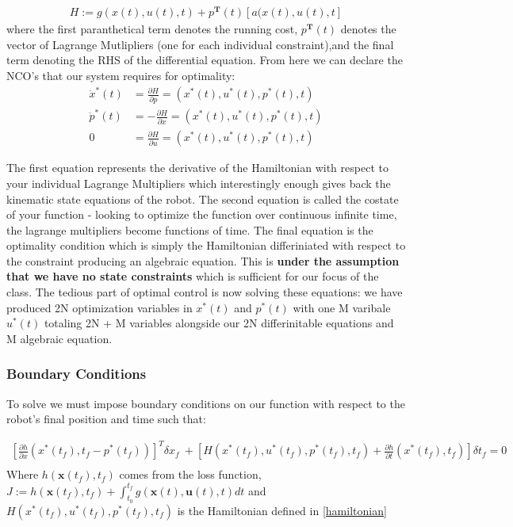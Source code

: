 ﻿\documentclass[twoside]{article}
\begin{document}
\begin{equation} \label{hamiltonian}
\begin{split}
H := g(x(t), u(t), t) + p^\textbf{T}(t)[a(x(t), u(t), t]
\end{split}
\end{equation}
where the first paranthetical term denotes the running cost, $p^\textbf{T}(t)$ denotes the vector of Lagrange Mutlipliers (one for each individual constraint),and the final term denoting the RHS of the differential equation.
From here we can declare the NCO's that our system requires for optimality:
\begin{equation} \label{hamiltonianNCOs}
\begin{split}
\dot{x}^*(t) &= \frac{\partial{H}}{\partial{p}} = (x^*(t), u^*(t), p^*(t), t)\\
\dot{p}^*(t) &= -\frac{\partial{H}}{\partial{x}} = (x^*(t), u^*(t), p^*(t), t)\\
0 &= \frac{\partial{H}}{\partial{u}} = (x^*(t), u^*(t), p^*(t), t)
\end{split}
\end{equation}

The first equation represents the derivative of the Hamiltonian with respect to your individual Lagrange Multipliers which interestingly enough gives back the kinematic state equations of the robot. The second equation is called the costate of your function - looking to optimize the function over continuous infinite time, the lagrange multipliers become functions of time. The final equation is the optimality condition which is simply the Hamiltonian differiniated with respect to the constraint producing an algebraic equation. This is \textbf{under the assumption that we have no state constraints} which is sufficient for our focus of the class. The tedious part of optimal control is now solving these equations: we have produced 2N optimization variables in $x^*(t)$ and $p^*(t)$ with one M varibale $u^*(t)$ totaling 2N + M variables alongside our 2N differinitable equations and M algebraic equation.

\subsubsection{Boundary Conditions}
To solve we must impose boundary conditions on our function with respect to the robot's final position and time such that:

\begin{equation} \label{hamiltonianBCs}
\begin{split}
[\frac{\partial{h}}{\partial{x}}(x^*(t_f), t_f - p^*(t_f))]^T\delta{x_f}\ + [H(x^*(t_f), u^*(t_f), p^*(t_f), t_f) + \frac{\partial{h}}{\partial{t}}(x^*(t_f), t_f)]\delta{t_f} = 0\\
\end{split}
\end{equation}
Where $h(\mathbf{x}(t_f),t_f)$ comes from the loss function, $J := h(\mathbf{x}(t_f),t_f) + \int_{t_0}^{t_f}  g(\mathbf{x}(t),\mathbf{u}(t),t) dt$ and $H(x^*(t_f), u^*(t_f), p^*(t_f), t_f)$ is the Hamiltonian defined in \ref{hamiltonian}
\\
\\
\end{document}
